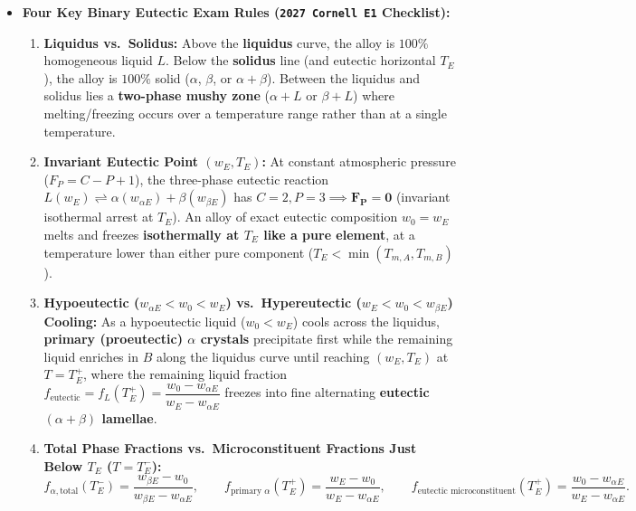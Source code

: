 \begin{itemize}
  \item \textbf{Four Key Binary Eutectic Exam Rules (\texttt{2027 Cornell E1} Checklist):}
  \begin{enumerate}
    \item \textbf{Liquidus vs.\ Solidus:} Above the \textbf{liquidus} curve, the alloy is $100\%$ homogeneous liquid $L$. Below the \textbf{solidus} line (and eutectic horizontal $T_E$), the alloy is $100\%$ solid ($\alpha$, $\beta$, or $\alpha + \beta$). Between the liquidus and solidus lies a \textbf{two-phase mushy zone} ($\alpha + L$ or $\beta + L$) where melting/freezing occurs over a temperature range rather than at a single temperature.
    \item \textbf{Invariant Eutectic Point $(w_E, T_E)$:} At constant atmospheric pressure ($F_P = C - P + 1$), the three-phase eutectic reaction $L(w_E) \rightleftharpoons \alpha(w_{\alpha E}) + \beta(w_{\beta E})$ has $C = 2, P = 3 \implies \mathbf{F_P = 0}$ (invariant isothermal arrest at $T_E$). An alloy of exact eutectic composition $w_0 = w_E$ melts and freezes \textbf{isothermally at $T_E$ like a pure element}, at a temperature lower than either pure component ($T_E < \min(T_{m,A}, T_{m,B})$).
    \item \textbf{Hypoeutectic ($w_{\alpha E} < w_0 < w_E$) vs.\ Hypereutectic ($w_E < w_0 < w_{\beta E}$) Cooling:} As a hypoeutectic liquid ($w_0 < w_E$) cools across the liquidus, \textbf{primary (proeutectic) $\alpha$ crystals} precipitate first while the remaining liquid enriches in $B$ along the liquidus curve until reaching $(w_E, T_E)$ at $T = T_E^+$, where the remaining liquid fraction $f_{\mathrm{eutectic}} = f_L(T_E^+) = \dfrac{w_0 - w_{\alpha E}}{w_E - w_{\alpha E}}$ freezes into fine alternating \textbf{eutectic $(\alpha + \beta)$ lamellae}.
    \item \textbf{Total Phase Fractions vs.\ Microconstituent Fractions Just Below $T_E$ ($T = T_E^-$):}
    \begin{equation}\label{eq:05:microconstituent}
      f_{\alpha,\mathrm{total}}(T_E^-) = \frac{w_{\beta E} - w_0}{w_{\beta E} - w_{\alpha E}}, \qquad
      f_{\text{primary }\alpha}(T_E^+) = \frac{w_E - w_0}{w_E - w_{\alpha E}}, \qquad
      f_{\text{eutectic microconstituent}}(T_E^+) = \frac{w_0 - w_{\alpha E}}{w_E - w_{\alpha E}}.
    \end{equation}
  \end{enumerate}
\end{itemize}

